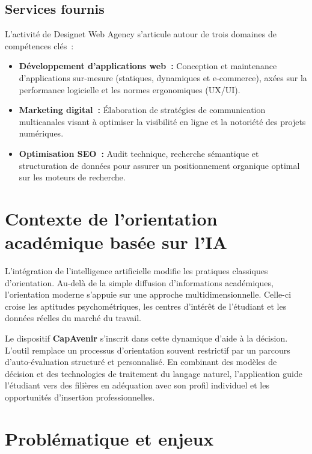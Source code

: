 \subsection{Services fournis}

L'activité de Designet Web Agency s'articule autour de trois domaines de compétences clés~:

\begin{itemize}
    \item \textbf{Développement d'applications web~:} Conception et maintenance d'applications sur-mesure (statiques, dynamiques et e-commerce), axées sur la performance logicielle et les normes ergonomiques (UX/UI).
    \item \textbf{Marketing digital~:} Élaboration de stratégies de communication multicanales visant à optimiser la visibilité en ligne et la notoriété des projets numériques.
    \item \textbf{Optimisation SEO~:} Audit technique, recherche sémantique et structuration de données pour assurer un positionnement organique optimal sur les moteurs de recherche.
\end{itemize}

\section{Contexte de l'orientation académique basée sur l'IA}
\label{sec:contexte_ia}

L'intégration de l'intelligence artificielle modifie les pratiques classiques d'orientation. Au-delà de la simple diffusion d'informations académiques, l'orientation moderne s'appuie sur une approche multidimensionnelle. Celle-ci croise les aptitudes psychométriques, les centres d'intérêt de l'étudiant et les données réelles du marché du travail.

Le dispositif \textbf{CapAvenir} s'inscrit dans cette dynamique d'aide à la décision. L'outil remplace un processus d'orientation souvent restrictif par un parcours d'auto-évaluation structuré et personnalisé. En combinant des modèles de décision et des technologies de traitement du langage naturel, l'application guide l'étudiant vers des filières en adéquation avec son profil individuel et les opportunités d'insertion professionnelles.

\section{Problématique et enjeux}
\label{sec:problematique}

